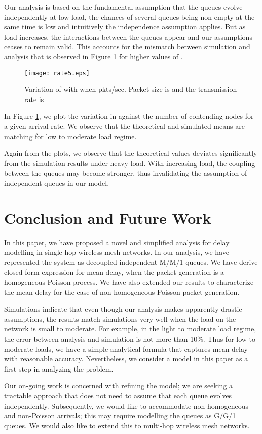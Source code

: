 \documentclass[10pt, conference, compsocconf]{IEEEtran}
\begin{document}
Our analysis is based on the fundamental assumption that the queues evolve independently at low load, the chances of several queues being non-empty at the same time is low and intuitively the independence assumption applies. But as load increases, the interactions between the queues appear and our assumptions ceases to remain valid. This accounts for the mismatch between simulation and analysis that is observed in Figure \ref{fig:rate5} for higher values of .
\begin{figure}[!h]
\centering
\texttt{[image: rate5.eps]}
\caption {Variation of  with  when  pkts/sec. Packet size is  and the transmission rate is  }
\label{fig:rate5}
\end{figure}

In Figure \ref{fig:rate5}, we plot the variation in  against the number of contending nodes  for a given arrival rate. We observe that the theoretical and simulated means are matching for low to moderate load regime. 

Again from the plots, we observe that the theoretical values deviates significantly from the simulation results under heavy load. With increasing load, the coupling between the queues may become stronger, thus invalidating the assumption of independent queues in our model. 

\section{\large{Conclusion and Future Work}}
In this paper, we have proposed a novel and simplified  analysis for delay modelling in single-hop wireless mesh networks. In our analysis, we have represented the system as decoupled independent M/M/1 queues. We have derive closed form expression for mean delay, when the packet generation is a homogeneous Poisson process. We have also extended our results to characterize the mean delay for the case of non-homogeneous Poisson packet generation.

Simulations indicate that even though our analysis makes apparently drastic assumptions, the results match simulations very well when the load on the network is small to moderate. For example, in the light to moderate load regime, the error between analysis and simulation is not more than 10\%. Thus for low to moderate loads, we have a simple analytical formula that captures mean delay with reasonable accuracy. Nevertheless, we consider a model in this paper as a first step in analyzing the problem.

Our on-going work is concerned with refining the model; we are seeking a tractable approach that does not need to assume that each queue evolves independently. Subsequently, we would like to accommodate non-homogeneous and non-Poisson arrivals; this may require modelling the queues as G/G/1 queues. We would also like to extend this to multi-hop wireless mesh networks.



\end{document}

